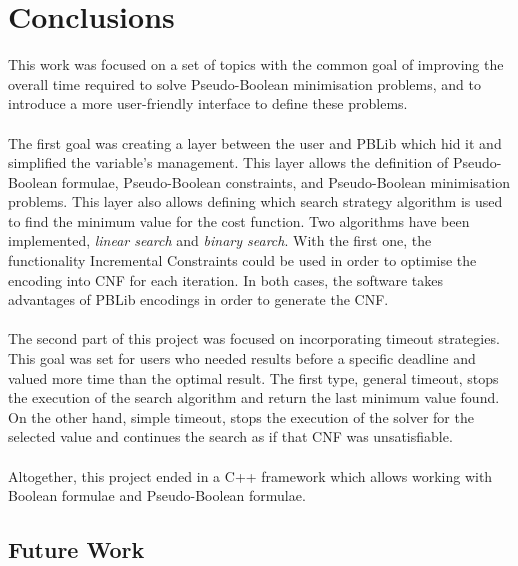 \chapter{Conclusions} 
\label{Chapter9}





This work was focused on a set of topics with the common goal of improving the overall time required to solve Pseudo-Boolean minimisation problems, and to introduce a more user-friendly interface to define these problems.\\\\
The first goal was creating a layer between the user and PBLib which hid it and simplified the variable's management. 
This layer allows the definition of Pseudo-Boolean formulae, Pseudo-Boolean constraints, and Pseudo-Boolean minimisation problems. This layer also allows defining which search strategy algorithm is used to find the minimum value for the cost function. Two algorithms have been implemented, \emph{linear search} and \emph{binary search}. With the first one, the functionality Incremental Constraints could be used in order to optimise the encoding into CNF for each iteration. In both cases, the software takes advantages of PBLib encodings in order to generate the CNF. \\\\
The second part of this project was focused on incorporating timeout strategies. This goal was set for users who needed results before a specific deadline and valued more time than the optimal result. The first type, general timeout, stops the execution of the search algorithm and return the last minimum value found. On the other hand, simple timeout, stops the execution of the solver for the selected value and continues the search as if that CNF was unsatisfiable. \\\\
Altogether, this project ended in a C++ framework which allows working with Boolean formulae and Pseudo-Boolean formulae. 


\section{Future Work}


